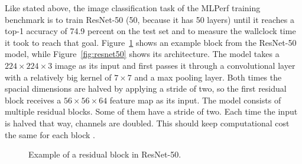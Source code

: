 \documentclass[]{article}
\begin{document}
Like stated above, the image classification task of the MLPerf
training benchmark is to train ResNet-50 (50, because it has 50
layers) until it reaches a top-1 accuracy of 74.9 percent on the test
set and to measure the wallclock time it took to reach that goal.
Figure~\ref{fig:resnet50_block} shows an example block from the
ResNet-50 model, while Figure~\ref{fig:resnet50} shows its
architecture.
The model takes a $224\times224\times3$ image as its input and first
passes it through a convolutional layer with a relatively big kernel
of $7\times7$ and a max pooling layer.
Both times the spacial dimensions are halved by applying a stride of
two, so the first residual block receives a $56 \times 56 \times 64$
feature map as its input.
The model consists of multiple residual blocks.
Some of them have a stride of two.
Each time the input is halved that way, channels are doubled.
This should keep computational cost the same for each block
\citep{he_et_al_2015}.

\begin{figure}
  \begin{center}
  \end{center}
  \caption{Example of a residual block in ResNet-50.}
  \label{fig:resnet50_block}
\end{figure}
\end{document}
